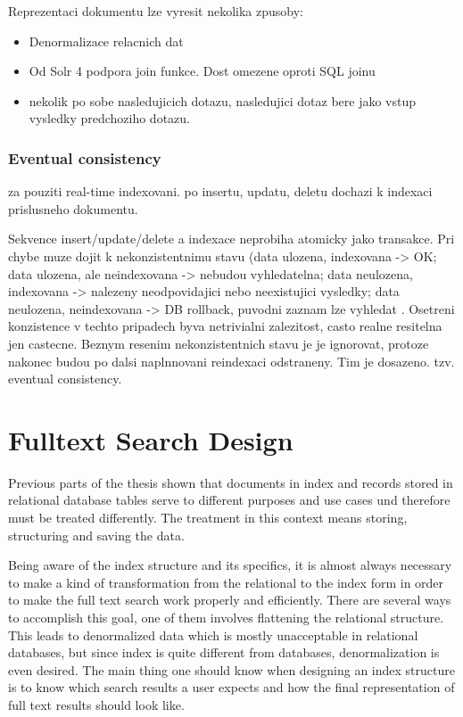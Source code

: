 \documentclass[12pt, oneside, a4paper]{book}
\begin{document}
Reprezentaci dokumentu lze vyresit nekolika zpusoby:
\begin{itemize}
\item Denormalizace relacnich dat
\item Od Solr 4 podpora join funkce. Dost omezene oproti SQL joinu
\item nekolik po sobe nasledujicich dotazu, nasledujici dotaz
bere jako vstup vysledky predchoziho dotazu.
\end{itemize}

\subsection{Eventual consistency}

za pouziti real-time indexovani. po insertu, updatu, deletu dochazi
k indexaci prislusneho dokumentu.

Sekvence insert/update/delete a indexace neprobiha atomicky jako transakce.
Pri chybe muze dojit k nekonzistentnimu stavu (data ulozena,
indexovana -> OK; data ulozena, ale neindexovana -> nebudou vyhledatelna;
data neulozena, indexovana -> nalezeny neodpovidajici nebo neexistujici
vysledky; data neulozena, neindexovana -> DB rollback, puvodni
zaznam lze vyhledat . Osetreni konzistence v techto pripadech
byva netrivialni zalezitost, casto realne resitelna jen
castecne. Beznym resenim nekonzistentnich stavu
je je ignorovat, protoze nakonec budou po dalsi naplnnovani reindexaci
odstraneny. Tim je dosazeno. tzv. eventual consistency.


\chapter{Fulltext Search Design}

Previous parts of the thesis shown that documents in index and records
stored in relational database tables serve to different purposes and
use cases und therefore must be treated differently. The treatment
in this context means storing, structuring and saving the data.

Being aware of the index structure and its specifics, it is almost
always necessary to make a kind of transformation from the relational
to the index form in order to make the full text search work properly
and efficiently. There are several ways to accomplish this goal, one
of them involves flattening the relational structure. This leads to
denormalized data which is mostly unacceptable in relational databases,
but since index is quite different from databases, denormalization
is even desired. The main thing one should know when designing an index
structure is to know which search results a user expects and how the
final representation of full text results should look like.
\end{document}
